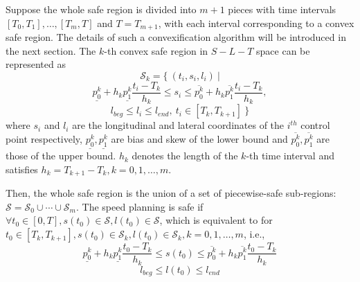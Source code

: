 \documentclass[journal,a4paper,onecolumn,12pt]{IEEEtran}
\begin{document}
Suppose the whole safe region is divided into $m+1$ pieces with time intervals $\left[T_{0}, T_{1}\right], \ldots,\left[T_{m}, T\right]$ and $T =T_{m+1}$, with each interval corresponding to a convex safe region. The details of such a convexification algorithm will be introduced in the next section. The $k$-th convex safe region in $S-L-T$ space can be represented as
$$\mathcal{S}_{k} = \{\ (t_i, s_i, l_i)\ | $$
$$\underline{p^{k}_0} + h_k \underline{p^{k}_1} \frac{t_i - T_k}{h_k} \leq s_i \leq \overline{p^{k}_0} + h_k \overline{p^{k}_1} \frac{t_i - T_k}{h_k},$$
$$l_{beg} \leq l_i \leq l_{end},\ t_i \in [T_k, T_{k+1}]\ \}$$
where $s_i$ and $l_i$ are the longitudinal and lateral coordinates of the $i^{th}$ control point respectively, $\underline{p_{0}^{k}}, \underline{p_{1}^{k}}$ are bias and skew of the lower bound and $\overline{p_{0}^{k}}, \overline{p_{1}^{k}}$ are those of the upper bound. $h_{k}$ denotes the length of the $k$-th time interval and satisfies $h_{k}=T_{k+1}-T_{k}, k=0,1, \ldots, m$.

Then, the whole safe region is the union of a set of piecewise-safe sub-regions: $\mathcal{S}=\mathcal{S}_{0} \cup \cdots \cup \mathcal{S}_{m}$. The speed planning is safe if $\forall t_{0} \in[0, T], s\left(t_{0}\right) \in \mathcal{S}, l\left(t_{0}\right) \in \mathcal{S}$, which is equivalent to for $t_{0} \in\left[T_{k}, T_{k+1}\right], s\left(t_{0}\right) \in \mathcal{S}_{k}, l\left(t_{0}\right) \in \mathcal{S}_{k}, k=0,1, \ldots, m$, i.e.,
$$
\underline{p_{0}^{k}}+h_{k} \underline{p_{1}^{k}} \frac{t_{0}-T_{k}}{h_{k}} \leq s\left(t_{0}\right) \leq \overline{p_{0}^{k}}+h_{k} \overline{p_{1}^{k}} \frac{t_{0}-T_{k}}{h_{k}}
$$
$$
l_{beg} \leq l\left(t_{0}\right) \leq l_{end}
$$
\end{document}
